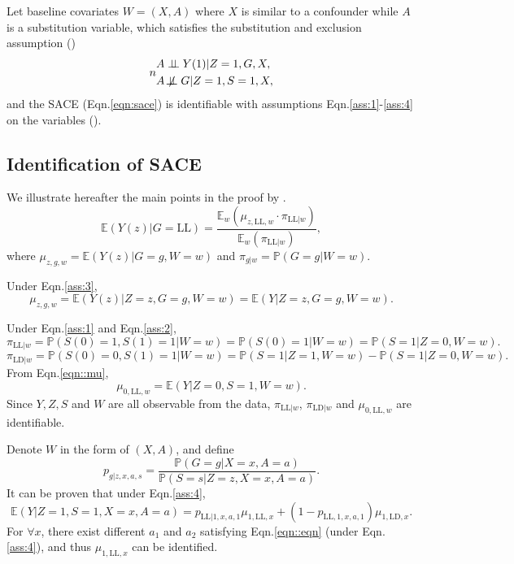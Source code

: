 \documentclass[article]{jss}
\def\ci{\perp\!\!\!\perp}
\def\nci{\not\!\perp\!\!\!\perp}
\begin{document}
Let baseline covariates $W=(X,A)$ where $X$ is similar to a confounder while $A$ is a substitution variable, which satisfies the substitution and exclusion assumption (\cite{10.1515/jci-2015-0024})
%
\begin{equation}n
  \begin{aligned}
  &A\ci Y(1)|Z=1,G,X,\\
  &A\nci G|Z=1,S=1,X,
  \end{aligned}
  \label{ass:4}
\end{equation}
%
and the SACE (Eqn.\ref{eqn:sace}) is identifiable with assumptions Eqn.\ref{ass:1}-\ref{ass:4} on the variables (\cite{Wang2017Identification}).

\subsection{Identification of SACE}

We illustrate hereafter the main points in the proof by \cite{Wang2017Identification}.
%
\begin{equation}
\mathbb{E}(Y(z)|G=\text{LL})=\frac{\mathbb{E}_w(\mu_{z,\text{LL},w}\cdot\pi_{\text{LL}|w})}{\mathbb{E}_w(\pi_{\text{LL}|w})},
\label{eqn::mu}
\end{equation}
where $\mu_{z,g,w}=\mathbb{E}(Y(z)|G=g,W=w)$ and $\pi_{g|w}=\mathbb{P}(G=g|W=w)$.

Under Eqn.\ref{ass:3}, 
\begin{equation}
\mu_{z,g,w}=\mathbb{E}(Y(z)|Z=z,G=g,W=w)=\mathbb{E}(Y|Z=z,G=g,W=w).
\end{equation}

Under Eqn.\ref{ass:1} and Eqn.\ref{ass:2},
\begin{equation}
  \pi_{\text{LL}|w}=\mathbb{P}(S(0)=1,S(1)=1|W=w)=\mathbb{P}(S(0)=1|W=w)=\mathbb{P}(S=1|Z=0,W=w).
\end{equation}
\begin{equation}
  \pi_{\text{LD}|w}=\mathbb{P}(S(0)=0,S(1)=1|W=w)=\mathbb{P}(S=1|Z=1,W=w)-\mathbb{P}(S=1|Z=0,W=w).
\end{equation}
From Eqn.\ref{eqn::mu},
\begin{equation}
  \mu_{0,\text{LL},w} = \mathbb{E}(Y|Z=0,S=1,W=w).
\end{equation}
Since $Y,Z,S$ and $W$ are all observable from the data, $\pi_{\text{LL}|w}$, $\pi_{\text{LD}|w}$ and $\mu_{0,\text{LL},w}$ are identifiable.

Denote $W$ in the form of $(X,A)$, and define
\begin{equation}
  p_{g|z,x,a,s}=\frac{\mathbb{P}(G=g|X=x,A=a)}{\mathbb{P}(S=s|Z=z,X=x,A=a)}.
\end{equation}
It can be proven that under Eqn.\ref{ass:4},
\begin{equation}
  \mathbb{E}(Y|Z=1,S=1,X=x,A=a)=p_{\text{LL}|1,x,a,1}\mu_{1,\text{LL},x}+(1-p_{\text{LL},1,x,a,1})\mu_{1,\text{LD},x}.
  \label{eqn::eqn}
\end{equation}
For $\forall x$, there exist different $a_1$ and $a_2$ satisfying Eqn.\ref{eqn::eqn} (under Eqn.\ref{ass:4}), and thus $\mu_{1,\text{LL},x}$ can be identified.
\end{document}
